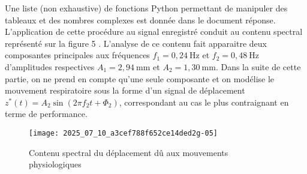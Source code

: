 Une liste (non exhaustive) de fonctions Python permettant de manipuler des tableaux et des nombres complexes est donnée dans le document réponse.\\
L'application de cette procédure au signal enregistré conduit au contenu spectral représenté sur la figure 5 . L'analyse de ce contenu fait apparaitre deux composantes principales aux fréquences $f_{1}=0,24 \mathrm{~Hz}$ et $f_{2}=0,48 \mathrm{~Hz}$ d'amplitudes respectives $A_{1}=2,94 \mathrm{~mm}$ et $A_{2}=1,30 \mathrm{~mm}$. Dans la suite de cette partie, on ne prend en compte qu'une seule composante et on modélise le mouvement respiratoire sous la forme d'un signal de déplacement $z^{*}(t)=A_{2} \sin \left(2 \pi f_{2} t+\Phi_{2}\right)$, correspondant au cas le plus contraignant en terme de performance.\\


\begin{figure}[!h]
\centering
\texttt{[image: 2025\_07\_10\_a3cef788f652ce14ded2g-05]}

\caption{Contenu spectral du déplacement dû aux mouvements physiologiques\label{ccs_psi_2019_fig_05}}
\end{figure}




